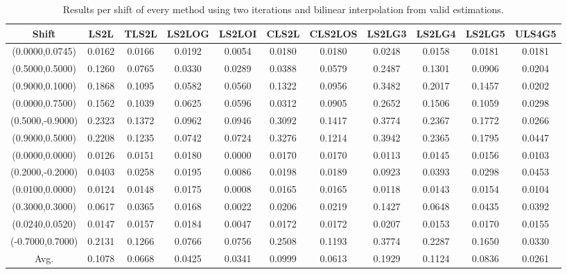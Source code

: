\begin{table}[ht!]
\centering
\begin{tabular}{c|c|c|c|c|c|c|c|c|c|c}
Shift & \scriptsize{LS2L} & \scriptsize{TLS2L} & \scriptsize{LS2LOG} & \scriptsize{LS2LOI} & \scriptsize{CLS2L} & \scriptsize{CLS2LOS} & \scriptsize{LS2LG3} & \scriptsize{LS2LG4} & \scriptsize{LS2LG5} & \scriptsize{ULS4G5}\\ \hline 
(0.0000,0.0745) & 0.0162 & 0.0166 & 0.0192 & 0.0054 & 0.0180 & 0.0180 & 0.0248 & 0.0158 & 0.0181 & 0.0181 \\ \hline
(0.5000,0.5000) & 0.1260 & 0.0765 & 0.0330 & 0.0289 & 0.0388 & 0.0579 & 0.2487 & 0.1301 & 0.0906 & 0.0204 \\ \hline
(0.9000,0.1000) & 0.1868 & 0.1095 & 0.0582 & 0.0560 & 0.1322 & 0.0956 & 0.3482 & 0.2017 & 0.1457 & 0.0202 \\ \hline
(0.0000,0.7500) & 0.1562 & 0.1039 & 0.0625 & 0.0596 & 0.0312 & 0.0905 & 0.2652 & 0.1506 & 0.1059 & 0.0298 \\ \hline
(0.5000,-0.9000) & 0.2323 & 0.1372 & 0.0962 & 0.0946 & 0.3092 & 0.1417 & 0.3774 & 0.2367 & 0.1772 & 0.0266 \\ \hline
(0.9000,0.5000) & 0.2208 & 0.1235 & 0.0742 & 0.0724 & 0.3276 & 0.1214 & 0.3942 & 0.2365 & 0.1795 & 0.0447 \\ \hline
(0.0000,0.0000) & 0.0126 & 0.0151 & 0.0180 & 0.0000 & 0.0170 & 0.0170 & 0.0113 & 0.0145 & 0.0156 & 0.0103 \\ \hline
(0.2000,-0.2000) & 0.0403 & 0.0258 & 0.0195 & 0.0086 & 0.0198 & 0.0189 & 0.0923 & 0.0393 & 0.0298 & 0.0453 \\ \hline
(0.0100,0.0000) & 0.0124 & 0.0148 & 0.0175 & 0.0008 & 0.0165 & 0.0165 & 0.0118 & 0.0143 & 0.0154 & 0.0104 \\ \hline
(0.3000,0.3000) & 0.0617 & 0.0365 & 0.0168 & 0.0022 & 0.0206 & 0.0219 & 0.1427 & 0.0648 & 0.0435 & 0.0392 \\ \hline
(0.0240,0.0520) & 0.0147 & 0.0157 & 0.0184 & 0.0047 & 0.0172 & 0.0172 & 0.0207 & 0.0153 & 0.0170 & 0.0155 \\ \hline
(-0.7000,0.7000) & 0.2131 & 0.1266 & 0.0766 & 0.0756 & 0.2508 & 0.1193 & 0.3774 & 0.2287 & 0.1650 & 0.0330 \\ \hline
Avg.  & 0.1078 & 0.0668 & 0.0425 & 0.0341 & 0.0999 & 0.0613 & 0.1929 & 0.1124 & 0.0836 & 0.0261 \\ \hline
\end{tabular}
\caption{Results per shift of every method using two iterations and bilinear interpolation from valid estimations.}
\label{tab:2itLperShiftValid}
\end{table}


